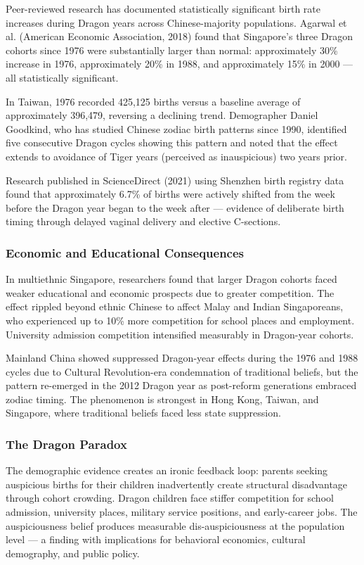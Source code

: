 \documentclass[11pt,letterpaper]{article}
\begin{document}
Peer-reviewed research has documented statistically significant birth rate increases during Dragon years across Chinese-majority populations. Agarwal et al. (American Economic Association, 2018) found that Singapore's three Dragon cohorts since 1976 were substantially larger than normal: approximately 30\% increase in 1976, approximately 20\% in 1988, and approximately 15\% in 2000 --- all statistically significant.

In Taiwan, 1976 recorded 425,125 births versus a baseline average of approximately 396,479, reversing a declining trend. Demographer Daniel Goodkind, who has studied Chinese zodiac birth patterns since 1990, identified five consecutive Dragon cycles showing this pattern and noted that the effect extends to avoidance of Tiger years (perceived as inauspicious) two years prior.

Research published in ScienceDirect (2021) using Shenzhen birth registry data found that approximately 6.7\% of births were actively shifted from the week before the Dragon year began to the week after --- evidence of deliberate birth timing through delayed vaginal delivery and elective C-sections.

\subsubsection{Economic and Educational Consequences}

In multiethnic Singapore, researchers found that larger Dragon cohorts faced weaker educational and economic prospects due to greater competition. The effect rippled beyond ethnic Chinese to affect Malay and Indian Singaporeans, who experienced up to 10\% more competition for school places and employment. University admission competition intensified measurably in Dragon-year cohorts.

Mainland China showed suppressed Dragon-year effects during the 1976 and 1988 cycles due to Cultural Revolution-era condemnation of traditional beliefs, but the pattern re-emerged in the 2012 Dragon year as post-reform generations embraced zodiac timing. The phenomenon is strongest in Hong Kong, Taiwan, and Singapore, where traditional beliefs faced less state suppression.

\subsubsection{The Dragon Paradox}

The demographic evidence creates an ironic feedback loop: parents seeking auspicious births for their children inadvertently create structural disadvantage through cohort crowding. Dragon children face stiffer competition for school admission, university places, military service positions, and early-career jobs. The auspiciousness belief produces measurable dis-auspiciousness at the population level --- a finding with implications for behavioral economics, cultural demography, and public policy.
\end{document}
